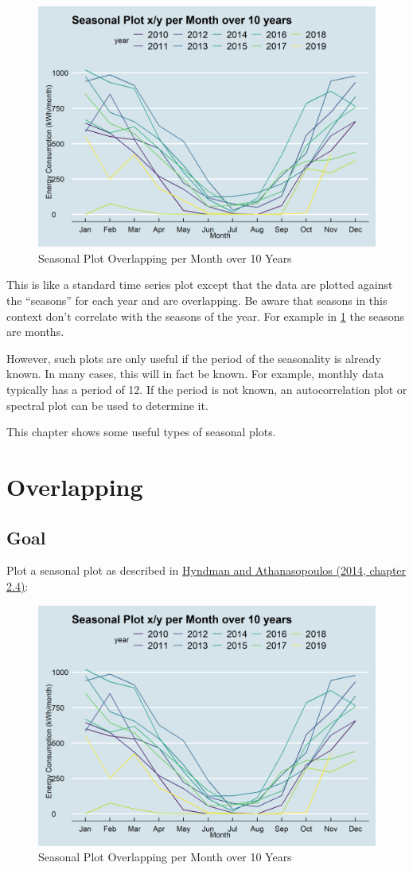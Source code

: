 \documentclass[
  a4paperpaper,
]{book}
\begin{document}
\begin{figure}
\includegraphics[width=0.7\linewidth]{images/plotSeasonalXY} \caption{Seasonal Plot Overlapping per Month over 10 Years}\label{fig:figplotSeasonalXY}
\end{figure}

This is like a standard time series plot except that the data are plotted against the ``seasons'' for each year and are overlapping. Be aware that seasons in this context don't correlate with the seasons of the year. For example in \ref{fig:figplotSeasonalXY} the seasons are months.

However, such plots are only useful if the period of the seasonality is already known. In many cases, this will in fact be known. For example, monthly data typically has a period of 12. If the period is not known, an autocorrelation plot or spectral plot can be used to determine it.

This chapter shows some useful types of seasonal plots.

\hypertarget{overlapping}{%
\section{Overlapping}\label{overlapping}}

\hypertarget{goal}{%
\subsection{Goal}\label{goal}}

Plot a seasonal plot as described in \href{https://otexts.com/fpp2/seasonal-plots.html}{Hyndman and Athanasopoulos (2014, chapter 2.4)}:

\begin{figure}
\includegraphics[width=0.7\linewidth]{images/plotSeasonalXY} \caption{Seasonal Plot Overlapping per Month over 10 Years}\label{fig:unnamed-chunk-9}
\end{figure}
\end{document}
